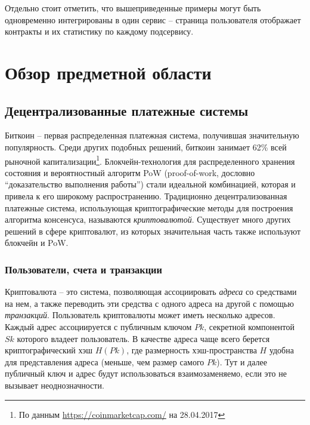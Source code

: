 \documentclass[specification,annotation]{itmo-student-thesis}
\begin{document}
Отдельно стоит отметить, что вышеприведенные примеры могут быть
одновременно интегрированы в один сервис -- страница пользователя
отображает контракты и их статистику по каждому подсервису.

\chapter{Обзор предметной области}

\startrelatedwork

\section{Децентрализованные платежные системы}

Биткоин -- первая распределенная платежная система, получившая
значительную популярность. Среди других подобных решений, биткоин
занимает 62\% всей рыночной капитализации\footnote{По данным
  \url{https://coinmarketcap.com/} на 28.04.2017}. Блокчейн-технология
для распределенного хранения состояния и вероятностный алгоритм PoW
(proof-of-work, дословно ``доказательство выполнения работы'') стали
идеальной комбинацией, которая и привела к его широкому
распространению. Традиционно децентрализованная платежные система,
использующая криптографические методы для построения алгоритма
консенсуса, называются {\it криптовалютой}. Существует много других
решений в сфере криптовалют, из которых значительная часть также
используют блокчейн и PoW.

\subsection{Пользователи, счета и транзакции}

Криптовалюта -- это система, позволяющая ассоциировать {\it адреса} со
средствами на нем, а также переводить эти средства с одного адреса на
другой с помощью {\it транзакций}. Пользователь криптовалюты может
иметь несколько адресов. Каждый адрес ассоциируется с публичным ключом
$Pk$, секретной компонентой $Sk$ которого владеет пользователь. В
качестве адреса чаще всего берется криптографический хэш $H(Pk)$, где
размерность хэш-пространства $H$ удобна для представления адреса
(меньше, чем размер самого $Pk$). Тут и далее публичный ключ и адрес
будут использоваться взаимозаменяемо, если это не вызывает
неоднозначности.
\end{document}
